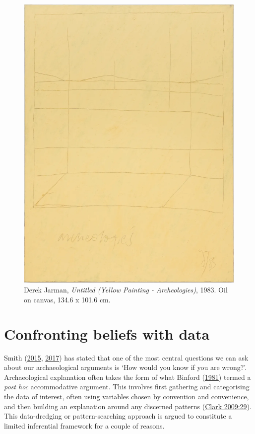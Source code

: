 \documentclass[
  12pt,
  a4paper,
  oneside]{book}
\begin{document}
\begin{figure}

{\centering \includegraphics[width=1\linewidth]{figures/jarman} 

}

\caption{Derek Jarman, \textit{Untitled (Yellow Painting - Archeologies)}, 1983. Oil on canvas, 134.6 x 101.6 cm.}\label{fig:jarman}
\end{figure}

\hypertarget{confronting}{%
\section{Confronting beliefs with data}\label{confronting}}

Smith (\protect\hyperlink{ref-smith2015}{2015}, \protect\hyperlink{ref-smith2017}{2017}) has stated that one of the most central questions we can ask about our archaeological arguments is `How would you know if you are wrong?'. Archaeological explanation often takes the form of what Binford (\protect\hyperlink{ref-binford1981}{1981}) termed a \emph{post hoc} accommodative argument. This involves first gathering and categorising the data of interest, often using variables chosen by convention and convenience, and then building an explanation around any discerned patterns (\protect\hyperlink{ref-clark2009}{Clark 2009:29}). This data-dredging or pattern-searching approach is argued to constitute a limited inferential framework for a couple of reasons.
\end{document}
